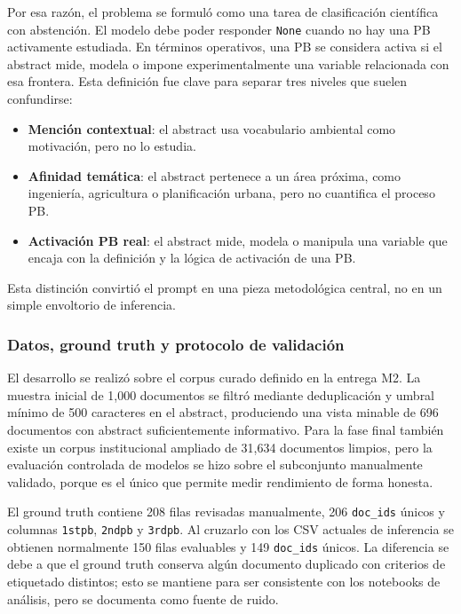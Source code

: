Por esa razón, el problema se formuló como una tarea de clasificación científica con abstención. El modelo debe poder responder \texttt{None} cuando no hay una PB activamente estudiada. En términos operativos, una PB se considera activa si el abstract mide, modela o impone experimentalmente una variable relacionada con esa frontera. Esta definición fue clave para separar tres niveles que suelen confundirse:

\begin{itemize}
\item \textbf{Mención contextual}: el abstract usa vocabulario ambiental como motivación, pero no lo estudia.
\item \textbf{Afinidad temática}: el abstract pertenece a un área próxima, como ingeniería, agricultura o planificación urbana, pero no cuantifica el proceso PB.
\item \textbf{Activación PB real}: el abstract mide, modela o manipula una variable que encaja con la definición y la lógica de activación de una PB.
\end{itemize}

Esta distinción convirtió el prompt en una pieza metodológica central, no en un simple envoltorio de inferencia.

\subsubsection*{Datos, ground truth y protocolo de validación}

El desarrollo se realizó sobre el corpus curado definido en la entrega M2. La muestra inicial de 1,000 documentos se filtró mediante deduplicación y umbral mínimo de 500 caracteres en el abstract, produciendo una vista minable de 696 documentos con abstract suficientemente informativo. Para la fase final también existe un corpus institucional ampliado de 31,634 documentos limpios, pero la evaluación controlada de modelos se hizo sobre el subconjunto manualmente validado, porque es el único que permite medir rendimiento de forma honesta.

El ground truth contiene 208 filas revisadas manualmente, 206 \texttt{doc\_ids} únicos y columnas \texttt{1stpb}, \texttt{2ndpb} y \texttt{3rdpb}. Al cruzarlo con los CSV actuales de inferencia se obtienen normalmente 150 filas evaluables y 149 \texttt{doc\_ids} únicos. La diferencia se debe a que el ground truth conserva algún documento duplicado con criterios de etiquetado distintos; esto se mantiene para ser consistente con los notebooks de análisis, pero se documenta como fuente de ruido.

